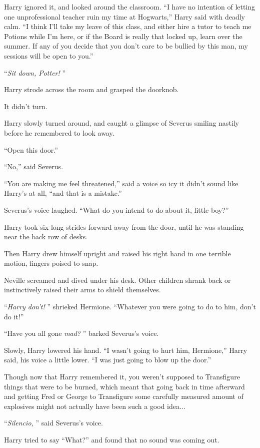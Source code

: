 Harry ignored it, and looked around the classroom. ``I have no intention
of letting one unprofessional teacher ruin my time at Hogwarts,'' Harry
said with deadly calm. ``I think I'll take my leave of this class, and
either hire a tutor to teach me Potions while I'm here, or if the Board
is really that locked up, learn over the summer. If any of you decide
that you don't care to be bullied by this man, my sessions will be open
to you.''

``\emph{Sit down, Potter!} ''

Harry strode across the room and grasped the doorknob.

It didn't turn.

Harry slowly turned around, and caught a glimpse of Severus smiling
nastily before he remembered to look away.

``Open this door.''

``No,'' said Severus.

``You are making me feel threatened,'' said a voice so icy it didn't
sound like Harry's at all, ``and that is a mistake.''

Severus's voice laughed. ``What do you intend to do about it, little
boy?''

Harry took six long strides forward away from the door, until he was
standing near the back row of desks.

Then Harry drew himself upright and raised his right hand in one
terrible motion, fingers poised to snap.

Neville screamed and dived under his desk. Other children shrank back or
instinctively raised their arms to shield themselves.

``\emph{Harry don't!} '' shrieked Hermione. ``Whatever you were going to
do to him, don't do it!''

``Have you all gone \emph{mad?} '' barked Severus's voice.

Slowly, Harry lowered his hand. ``I wasn't going to hurt him,
Hermione,'' Harry said, his voice a little lower. ``I was just going to
blow up the door.''

Though now that Harry remembered it, you weren't supposed to Transfigure
things that were to be burned, which meant that going back in time
afterward and getting Fred or George to Transfigure some carefully
measured amount of explosives might not actually have been such a good
idea...

``\emph{Silencio,} '' said Severus's voice.

Harry tried to say ``What?'' and found that no sound was coming out.

